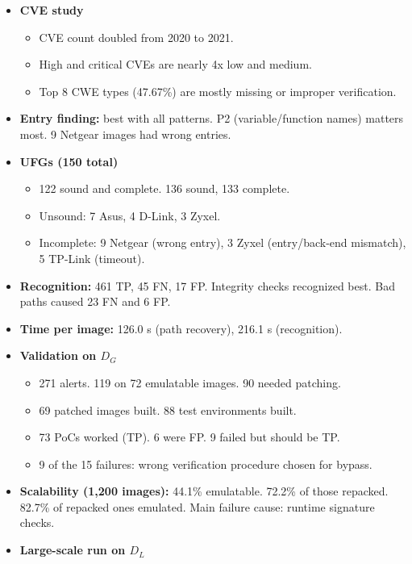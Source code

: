 \documentclass[11pt,a4paper]{article}
\begin{document}
\begin{enumerate}
    \begin{itemize}
        \item \textbf{CVE study}
        \begin{itemize}
            \item CVE count doubled from 2020 to 2021.
            \item High and critical CVEs are nearly 4x low and medium.
            \item Top 8 CWE types (47.67\%) are mostly missing or improper verification.
        \end{itemize}
        \item \textbf{Entry finding:} best with all patterns. P2 (variable/function names) matters most. 9 Netgear images had wrong entries.
        \item \textbf{UFGs (150 total)}
        \begin{itemize}
            \item 122 sound and complete. 136 sound, 133 complete.
            \item Unsound: 7 Asus, 4 D-Link, 3 Zyxel.
            \item Incomplete: 9 Netgear (wrong entry), 3 Zyxel (entry/back-end mismatch), 5 TP-Link (timeout).
        \end{itemize}
        \item \textbf{Recognition:} 461 TP, 45 FN, 17 FP. Integrity checks recognized best. Bad paths caused 23 FN and 6 FP.
        \item \textbf{Time per image:} 126.0 s (path recovery), 216.1 s (recognition).
        \item \textbf{Validation on $D_G$}
        \begin{itemize}
            \item 271 alerts. 119 on 72 emulatable images. 90 needed patching.
            \item 69 patched images built. 88 test environments built.
            \item 73 PoCs worked (TP). 6 were FP. 9 failed but should be TP.
            \item 9 of the 15 failures: wrong verification procedure chosen for bypass.
        \end{itemize}
        \item \textbf{Scalability (1,200 images):} 44.1\% emulatable. 72.2\% of those repacked. 82.7\% of repacked ones emulated. Main failure cause: runtime signature checks.
        \item \textbf{Large-scale run on $D_L$}

\end{itemize}
\end{enumerate}
\end{document}
